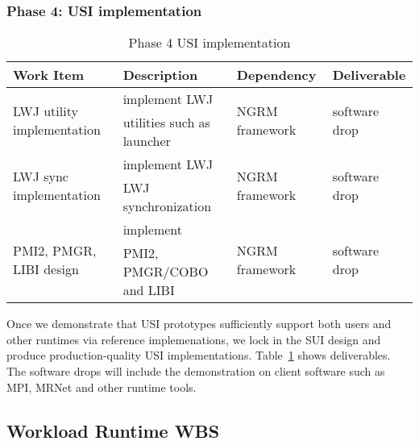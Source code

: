 \subsubsection{Phase 4: USI implementation}
\begin{table}
\centering
\begin{tabular}{|l|l|l|l|}
\hline
Work Item & Description & Dependency & Deliverable \\
\hline
\multirow{2}{*}{LWJ utility implementation} & implement LWJ& \multirow{2}{*}{NGRM framework} & \multirow{2}{*}{software drop} \\
& utilities such as launcher & & \\ \hline
\multirow{2}{*}{LWJ sync implementation} & implement LWJ& \multirow{2}{*}{NGRM framework} & \multirow{2}{*}{software drop} \\
& LWJ synchronization & & \\ \hline
\multirow{2}{*}{PMI2, PMGR, LIBI design} & implement & \multirow{2}{*}{NGRM framework} & \multirow{2}{*}{software drop} \\
& PMI2, PMGR/COBO and LIBI & & \\ \hline
\end{tabular}
\caption{Phase 4 USI implementation}
\label{tab:phase4}
\end{table}

Once we demonstrate that USI prototypes sufficiently support both users and
other runtimes via reference implemenations, we lock in the SUI design and
produce production-quality USI implementations. Table~\ref{tab:phase4} shows
deliverables. The software drops will include the demonstration on client
software such as MPI, MRNet and other runtime tools.

\ifwbs
\newpage
\subsection{Workload Runtime WBS}

